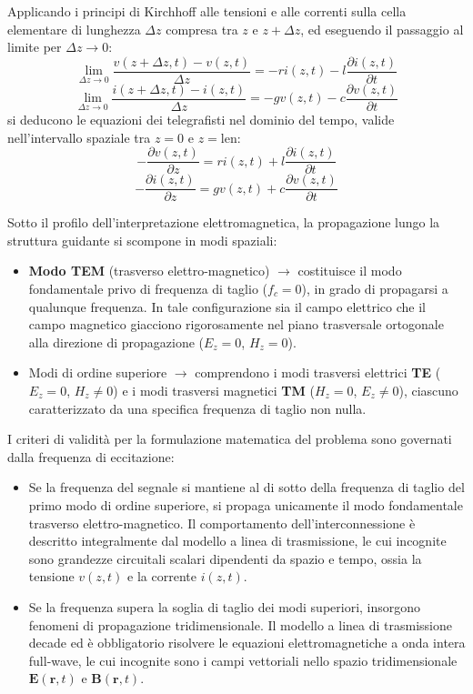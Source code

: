 Applicando i principi di Kirchhoff alle tensioni e alle correnti sulla cella elementare di lunghezza $\Delta z$ compresa tra $z$ e $z + \Delta z$, ed eseguendo il passaggio al limite per $\Delta z \to 0$:
\[
\lim_{\Delta z \to 0} \frac{v(z+\Delta z, t) - v(z,t)}{\Delta z} = - r i(z,t) - l \frac{\partial i(z,t)}{\partial t}
\]
\[
\lim_{\Delta z \to 0} \frac{i(z+\Delta z, t) - i(z,t)}{\Delta z} = - g v(z,t) - c \frac{\partial v(z,t)}{\partial t}
\]
si deducono le equazioni dei telegrafisti nel dominio del tempo, valide nell'intervallo spaziale tra $z = 0$ e $z = \text{len}$:
\[
-\frac{\partial v(z,t)}{\partial z} = r i(z,t) + l \frac{\partial i(z,t)}{\partial t}
\]
\[
-\frac{\partial i(z,t)}{\partial z} = g v(z,t) + c \frac{\partial v(z,t)}{\partial t}
\]

Sotto il profilo dell'interpretazione elettromagnetica, la propagazione lungo la struttura guidante si scompone in modi spaziali:
\begin{itemize}
    \item \textbf{Modo TEM} (trasverso elettro-magnetico) $\rightarrow$ costituisce il modo fondamentale privo di frequenza di taglio ($f_c = 0$), in grado di propagarsi a qualunque frequenza. In tale configurazione sia il campo elettrico che il campo magnetico giacciono rigorosamente nel piano trasversale ortogonale alla direzione di propagazione ($E_z = 0$, $H_z = 0$).
    \item Modi di ordine superiore $\rightarrow$ comprendono i modi trasversi elettrici \textbf{TE} ($E_z = 0$, $H_z \ne 0$) e i modi trasversi magnetici \textbf{TM} ($H_z = 0$, $E_z \ne 0$), ciascuno caratterizzato da una specifica frequenza di taglio non nulla.
\end{itemize}

I criteri di validità per la formulazione matematica del problema sono governati dalla frequenza di eccitazione:
\begin{itemize}
    \item Se la frequenza del segnale si mantiene al di sotto della frequenza di taglio del primo modo di ordine superiore, si propaga unicamente il modo fondamentale trasverso elettro-magnetico. Il comportamento dell'interconnessione è descritto integralmente dal modello a linea di trasmissione, le cui incognite sono grandezze circuitali scalari dipendenti da spazio e tempo, ossia la tensione $v(z,t)$ e la corrente $i(z,t)$.
    \item Se la frequenza supera la soglia di taglio dei modi superiori, insorgono fenomeni di propagazione tridimensionale. Il modello a linea di trasmissione decade ed è obbligatorio risolvere le equazioni elettromagnetiche a onda intera full-wave, le cui incognite sono i campi vettoriali nello spazio tridimensionale $\mathbf{E}(\mathbf{r},t)$ e $\mathbf{B}(\mathbf{r},t)$.
\end{itemize}

